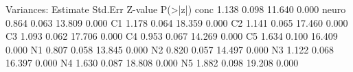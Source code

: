 \begin{Schunk}
\begin{Soutput}
Variances:
                   Estimate  Std.Err  Z-value  P(>|z|)
    conc              1.138    0.098   11.640    0.000
    neuro             0.864    0.063   13.809    0.000
    C1                1.178    0.064   18.359    0.000
    C2                1.141    0.065   17.460    0.000
    C3                1.093    0.062   17.706    0.000
    C4                0.953    0.067   14.269    0.000
    C5                1.634    0.100   16.409    0.000
    N1                0.807    0.058   13.845    0.000
    N2                0.820    0.057   14.497    0.000
    N3                1.122    0.068   16.397    0.000
    N4                1.630    0.087   18.808    0.000
    N5                1.882    0.098   19.208    0.000
\end{Soutput}
\end{Schunk}
